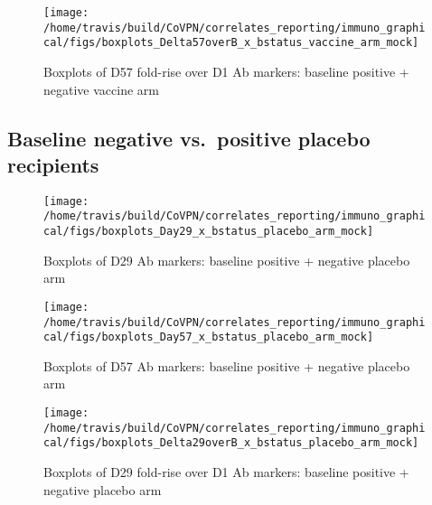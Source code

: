 \documentclass[]{book}
\theoremstyle{definition}
\theoremstyle{definition}
\theoremstyle{definition}
\newcommand{\1}{\mathbbm{1}}
\begin{document}
\clearpage
\begin{figure}[H]

{\centering \texttt{[image: /home/travis/build/CoVPN/correlates\_reporting/immuno\_graphical/figs/boxplots\_Delta57overB\_x\_bstatus\_vaccine\_arm\_mock]} 

}

\caption{Boxplots of D57 fold-rise over D1 Ab markers: baseline positive + negative vaccine arm}\label{fig:unnamed-chunk-48}
\end{figure}

\clearpage

\hypertarget{baseline-negative-vs.positive-placebo-recipients}{%
\subsection{Baseline negative vs.~positive placebo recipients}\label{baseline-negative-vs.positive-placebo-recipients}}

\begin{figure}[H]

{\centering \texttt{[image: /home/travis/build/CoVPN/correlates\_reporting/immuno\_graphical/figs/boxplots\_Day29\_x\_bstatus\_placebo\_arm\_mock]} 

}

\caption{Boxplots of D29 Ab markers: baseline positive + negative placebo arm}\label{fig:unnamed-chunk-49}
\end{figure}

\clearpage
\begin{figure}[H]

{\centering \texttt{[image: /home/travis/build/CoVPN/correlates\_reporting/immuno\_graphical/figs/boxplots\_Day57\_x\_bstatus\_placebo\_arm\_mock]} 

}

\caption{Boxplots of D57 Ab markers: baseline positive + negative placebo arm}\label{fig:unnamed-chunk-50}
\end{figure}

\clearpage
\begin{figure}[H]

{\centering \texttt{[image: /home/travis/build/CoVPN/correlates\_reporting/immuno\_graphical/figs/boxplots\_Delta29overB\_x\_bstatus\_placebo\_arm\_mock]} 

}

\caption{Boxplots of D29 fold-rise over D1 Ab markers: baseline positive + negative placebo arm}\label{fig:unnamed-chunk-51}
\end{figure}
\end{document}
